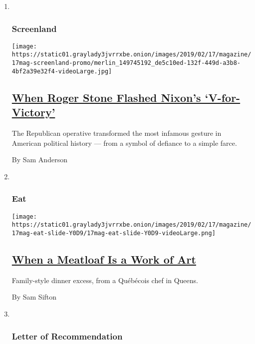 \begin{enumerate}
\def\labelenumi{\arabic{enumi}.}
\item ~
  \hypertarget{screenland}{%
  \subsubsection{Screenland}\label{screenland}}

  \texttt{[image: https://static01.graylady3jvrrxbe.onion/images/2019/02/17/magazine/17mag-screenland-promo/merlin\_149745192\_de5c10ed-132f-449d-a3b8-4bf2a39e32f4-videoLarge.jpg]}

  \hypertarget{when-roger-stone-flashed-nixons-v-for-victory}{%
  \subsection{\texorpdfstring{\href{/2019/02/13/magazine/when-roger-stone-flashed-nixons-v-for-victory.html}{When
  Roger Stone Flashed Nixon's
  `V-for-Victory'}}{When Roger Stone Flashed Nixon's `V-for-Victory'}}\label{when-roger-stone-flashed-nixons-v-for-victory}}

  The Republican operative transformed the most infamous gesture in
  American political history --- from a symbol of defiance to a simple
  farce.

  By Sam Anderson
\item ~
  \hypertarget{eat}{%
  \subsubsection{Eat}\label{eat}}

  \texttt{[image: https://static01.graylady3jvrrxbe.onion/images/2019/02/17/magazine/17mag-eat-slide-Y0D9/17mag-eat-slide-Y0D9-videoLarge.png]}

  \hypertarget{when-a-meatloaf-is-a-work-of-art}{%
  \subsection{\texorpdfstring{\href{/2019/02/13/magazine/meatloaf-quebec-recipe.html}{When
  a Meatloaf Is a Work of
  Art}}{When a Meatloaf Is a Work of Art}}\label{when-a-meatloaf-is-a-work-of-art}}

  Family-style dinner excess, from a Québécois chef in Queens.

  By Sam Sifton
\item ~
  \hypertarget{letter-of-recommendation}{%
  \subsubsection{Letter of
  Recommendation}\label{letter-of-recommendation}}


\end{enumerate}

